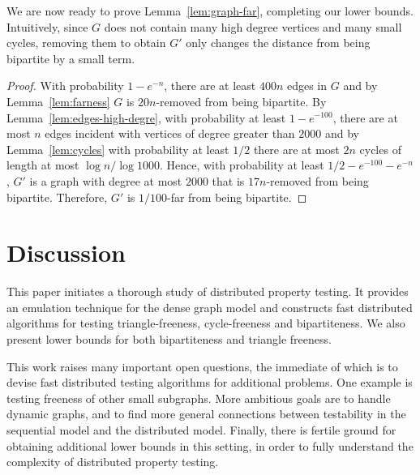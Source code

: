 \documentclass[11pt]{article}
\begin{document}
We are now ready to prove Lemma~\ref{lem:graph-far}, completing our lower bounds. Intuitively, since $G$ does not contain many high degree vertices and many small cycles, removing them to obtain $G'$ only changes the distance from being bipartite by a small term.
\begin{proof}
  With probability $1-e^{-n}$, there are at least $400n$ edges in $G$ and by Lemma~\ref{lem:farness} $G$ is $20n$-removed from
  being bipartite. By Lemma~\ref{lem:edges-high-degre}, with probability at least $1 - e^{-100}$,
  there are at most $n$ edges incident with vertices of degree greater than $2000$ and by Lemma~\ref{lem:cycles} with
  probability at least $1/2$ there are at most $2n$ cycles of length at most $\log n/\log 1000$.
  Hence, with probability at least $1/2-e^{-100} - e^{-n}$, $G'$ is a graph with degree at most
  $2000$ that is $17n$-removed from being bipartite.  Therefore, $G'$ is $1/100$-far from being
  bipartite.
\end{proof}




\section{Discussion}
\label{sec:discussion}
This paper initiates a thorough study of distributed property testing. It provides an emulation technique for the dense graph model and constructs fast
distributed algorithms for testing triangle-freeness, cycle-freeness and bipartiteness. We also present lower bounds for both bipartiteness and triangle freeness.   

This work raises many important open questions, the immediate of which is to devise fast distributed testing algorithms for additional problems. One example is testing freeness of other small subgraphs.
More ambitious goals are to handle dynamic graphs, and to find more general connections between testability in the sequential model and the distributed model.
Finally, there is fertile ground for obtaining additional lower bounds in this setting, in order to fully
understand the complexity of distributed property testing.	



\end{document}
